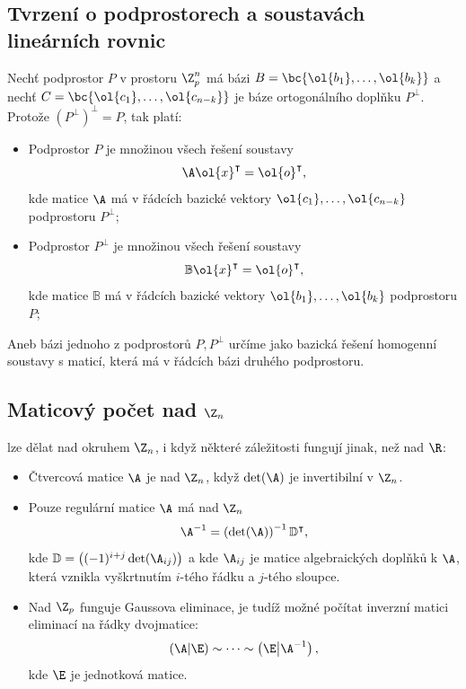 \subsection{Tvrzení o podprostorech a soustavách lineárních rovnic}
Nechť podprostor $P$ v prostoru $\Z_p^n$ má bázi $B = \bc{\ol{b_1}, \dots, \ol{b_k}}$ a nechť $C = \bc{\ol{c_1}, \dots, \ol{c_{n-k}}} $ je báze ortogonálního doplňku $P^\perp$. Protože $\left(P^\perp\right)^\perp = P$, tak platí:
\vspace{-1em} 
\begin{itemize}
	\item Podprostor $P$ je množinou všech řešení soustavy
	\begin{equation}
		\A \ol{x}^\intercal = \ol{o}^\intercal,
	\end{equation}
	kde matice $\A$ má v řádcích bazické vektory $\ol{c_1}, \dots, \ol{c_{n-k}}$ podprostoru $P^\perp$;
	\item Podprostor $P^\perp$ je množinou všech řešení soustavy
	\begin{equation}
		\mathbb{B} \ol{x}^\intercal = \ol{o}^\intercal,
	\end{equation}
	kde matice $\mathbb{B}$ má v řádcích bazické vektory $\ol{b_1}, \dots, \ol{b_k}$ podprostoru $P$;
\end{itemize}
\vspace{-1em}
Aneb bázi jednoho z podprostorů $P, P^\perp$ určíme jako bazická řešení homogenní soustavy s maticí, která má v řádcích bázi druhého podprostoru.

\subsection{Maticový počet nad \texorpdfstring{$\Z_n$}{Zn}}
 lze dělat nad okruhem $\Z_n$, i když některé záležitosti fungují jinak, než nad $\R$:
\vspace{-1em}
\begin{itemize}
	\item Čtvercová matice $\A$ je  nad $\Z_n$, když $\det(\A)$ je invertibilní v $\Z_n$.
	\item Pouze regulární matice $\A$ má  nad $\Z_n$
	\begin{equation}
		\A^{-1} = \left(\det(\A)\right)^{-1} \mathbb{D}^\intercal,
	\end{equation}
	kde $\mathbb{D} = \left((-1)^{i+j} \det(\A_{ij})\right)$ a kde $\A_{ij}$ je matice algebraických doplňků k $\A$, která vznikla vyškrtnutím $i$-tého řádku a $j$-tého sloupce.
	\item Nad $\Z_p$ funguje Gaussova eliminace, je tudíž možné počítat inverzní matici eliminací na řádky dvojmatice:
	\begin{equation}
		\left(\A \middle| \E\right) \sim \dots \sim \left(\E \middle| \A^{-1}\right),
	\end{equation}
	kde $\E$ je jednotková matice.
\end{itemize}

